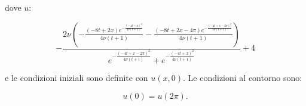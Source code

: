 \noindent
dove $u$: 

\begin{equation}
- \frac{2\nu\left(-\frac{(-8t + 2x) e^{-\frac{(-4t + x)^2}{4\nu(t + 1)}}}{4\nu(t + 1)} - \frac{(-8t + 2x - 4\pi) e^{-\frac{(-4t + x - 2\pi)^2}{4\nu(t + 1)}}}{4\nu(t + 1)} \right)}{e^{-\frac{(-4t + x - 2\pi)^2}{4\nu(t + 1)}} + e^{-\frac{(-4t + x)^2}{4\nu(t + 1)}}} + 4
\end{equation}

\noindent
e le condizioni iniziali sono definite con $u(x, 0)$. Le condizioni al contorno sono: 

\begin{equation}
u(0) = u(2\pi).
\end{equation}



